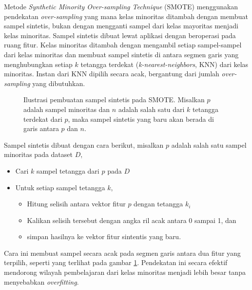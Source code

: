 Metode \textit{Synthetic Minority Over-sampling Technique} (SMOTE)
\parencite{chawla2002smote} menggunakan pendekatan \textit{over-sampling} yang mana
kelas minoritas ditambah dengan membuat sampel sintetis, bukan dengan
mengganti sampel dari kelas mayoritas menjadi kelas minoritas.
Sampel sintetis dibuat lewat aplikasi dengan beroperasi pada
ruang fitur.
Kelas minoritas ditambah dengan mengambil setiap sampel-sampel dari kelas
minoritas dan membuat sampel sintetis di antara segmen garis yang menghubungkan
setiap $k$ tetangga terdekat (\textit{k-nearest-neighbors}, KNN) dari kelas
minoritas.
Instan dari KNN dipilih secara acak, bergantung dari jumlah
\textit{over-sampling} yang dibutuhkan.

\begin{figure}[htbp]
\centering
\setlength\fboxsep{4pt}
	\caption{
	Ilustrasi pembuatan sampel sintetis pada SMOTE.
	Misalkan $p$ adalah sampel minoritas dan $n$ adalah salah satu dari $k$
	tetangga terdekat dari $p$, maka
	sampel sintetis yang baru akan berada di garis antara $p$ dan $n$.
	}
	\label{fig:smote}
\end{figure}

Sampel sintetis dibuat dengan cara berikut, misalkan $p$ adalah salah satu
sampel minoritas pada dataset $D$,
\pagebreak
\begin{itemize}
	\item Cari $k$ sampel tetangga dari $p$ pada $D$
	\item Untuk setiap sampel tetangga $k$,
	\begin{itemize}
		\item Hitung selisih antara vektor fitur $p$ dengan tetangga $k_{i}$
		\item Kalikan selisih tersebut dengan angka ril acak antara 0 sampai 1,
		dan
		\item simpan hasilnya ke vektor fitur sintentis yang baru.
	\end{itemize}
\end{itemize}

Cara ini membuat sampel secara acak pada segmen garis antara dua fitur yang
terpilih, seperti yang terlihat pada gambar \ref{fig:smote}.
Pendekatan ini secara efektif mendorong wilayah pembelajaran dari kelas
minoritas menjadi lebih besar tanpa menyebabkan \textit{overfitting}.
